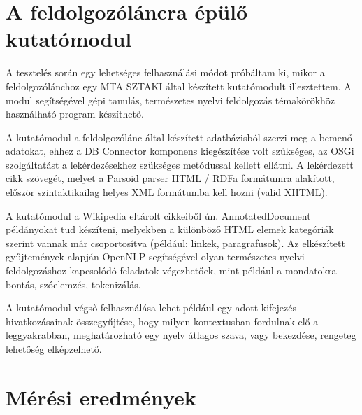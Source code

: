 
\section{A feldolgozóláncra épülő kutatómodul}
\label{sec:researchbundle}

A tesztelés során egy lehetséges felhasználási módot próbáltam ki, mikor a feldolgozólánchoz egy MTA SZTAKI által készített kutatómodult illesztettem. A modul segítségével gépi tanulás, természetes nyelvi feldolgozás témakörökhöz használható program készíthető.

A kutatómodul a feldolgozólánc által készített adatbázisból szerzi meg a bemenő adatokat, ehhez a DB Connector komponens kiegészítése volt szükséges, az OSGi szolgáltatást a lekérdezésekhez szükséges metódussal kellett ellátni. A lekérdezett cikk szövegét, melyet a Parsoid parser HTML / RDFa formátumra alakított, először szintaktikailag helyes XML formátumba kell hozni (valid XHTML).

A kutatómodul a Wikipedia eltárolt cikkeiből ún. AnnotatedDocument példányokat tud készíteni, melyekben a különböző HTML elemek kategóriák szerint vannak már csoportosítva (például: linkek, paragrafusok). Az elkészített gyűjtemények alapján OpenNLP segítségével olyan természetes nyelvi feldolgozáshoz kapcsolódó feladatok végezhetőek, mint például a mondatokra bontás, szóelemzés, tokenizálás.

A kutatómodul végső felhasználása lehet például egy adott kifejezés hivatkozásainak összegyűjtése, hogy milyen kontextusban fordulnak elő a leggyakrabban, meghatározható egy nyelv átlagos szava, vagy bekezdése, rengeteg lehetőség elképzelhető.


\section{Mérési eredmények}
\label{sec:measurement}



